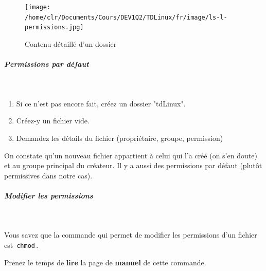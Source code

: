 \documentclass[11pt,a4paper]{article}
\begin{document}
            \par
        \begin{figure}[hbt]
				    \begin{center}
					\texttt{[image: /home/clr/Documents/Cours/DEV1Q2/TDLinux/fr/image/ls-l-permissions.jpg]}
						\end{center}
                
                    \caption[Contenu d\'etaill\'e d'un dossier]{Contenu d\'etaill\'e d'un dossier}
                \end{figure}
                    \clearpage
			
		\subparagraph{Permissions par d\'efaut} 
		
					\textcolor{white}{.} \par
				
            \par
        
					\begin{enumerate}
				
			\item Si ce n'est pas encore fait, cr\'eez un dossier "tdLinux".
			\item Cr\'eez-y un fichier vide.
			\item Demandez les d\'etails du fichier (propri\'etaire, groupe, permission)
					\end{enumerate}
				 
					On constate qu'un nouveau fichier appartient \`a celui qui l'a cr\'e\'e 
					(on s'en doute) et au groupe principal du cr\'eateur. 
					Il y a aussi des permissions par d\'efaut (plut\^ot permissives dans notre cas).  
				
            \par
        
			
		\subparagraph{Modifier les permissions} 
		
					\textcolor{white}{.} \par
				
            \par
          
					Vous savez que la commande qui permet de modifier les permissions d'un fichier est 
					\,\verb|chmod|\,.  
				
            \par
          
					Prenez le temps de \textbf{lire} 
					la page de \textbf{manuel} de cette commande.   
				
            \par
        
\end{document}
